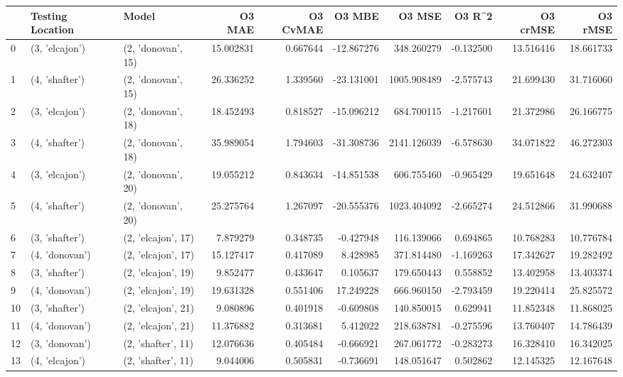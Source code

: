\begin{tabular}{lllrrrrrrr}
\toprule
{} & Testing Location &               Model &     O3 MAE &  O3 CvMAE &     O3 MBE &       O3 MSE &    O3 R\textasciicircum2 &   O3 crMSE &    O3 rMSE \\
\midrule
0  &   (3, 'elcajon') &  (2, 'donovan', 15) &  15.002831 &  0.667644 & -12.867276 &   348.260279 & -0.132500 &  13.516416 &  18.661733 \\
1  &   (4, 'shafter') &  (2, 'donovan', 15) &  26.336252 &  1.339560 & -23.131001 &  1005.908489 & -2.575743 &  21.699430 &  31.716060 \\
2  &   (3, 'elcajon') &  (2, 'donovan', 18) &  18.452493 &  0.818527 & -15.096212 &   684.700115 & -1.217601 &  21.372986 &  26.166775 \\
3  &   (4, 'shafter') &  (2, 'donovan', 18) &  35.989054 &  1.794603 & -31.308736 &  2141.126039 & -6.578630 &  34.071822 &  46.272303 \\
4  &   (3, 'elcajon') &  (2, 'donovan', 20) &  19.055212 &  0.843634 & -14.851538 &   606.755460 & -0.965429 &  19.651648 &  24.632407 \\
5  &   (4, 'shafter') &  (2, 'donovan', 20) &  25.275764 &  1.267097 & -20.555376 &  1023.404092 & -2.665274 &  24.512866 &  31.990688 \\
6  &   (3, 'shafter') &  (2, 'elcajon', 17) &   7.879279 &  0.348735 &  -0.427948 &   116.139066 &  0.694865 &  10.768283 &  10.776784 \\
7  &   (4, 'donovan') &  (2, 'elcajon', 17) &  15.127417 &  0.417089 &   8.428985 &   371.814480 & -1.169263 &  17.342627 &  19.282492 \\
8  &   (3, 'shafter') &  (2, 'elcajon', 19) &   9.852477 &  0.433647 &   0.105637 &   179.650443 &  0.558852 &  13.402958 &  13.403374 \\
9  &   (4, 'donovan') &  (2, 'elcajon', 19) &  19.631328 &  0.551406 &  17.249228 &   666.960150 & -2.793459 &  19.220414 &  25.825572 \\
10 &   (3, 'shafter') &  (2, 'elcajon', 21) &   9.080896 &  0.401918 &  -0.609808 &   140.850015 &  0.629941 &  11.852348 &  11.868025 \\
11 &   (4, 'donovan') &  (2, 'elcajon', 21) &  11.376882 &  0.313681 &   5.412022 &   218.638781 & -0.275596 &  13.760407 &  14.786439 \\
12 &   (3, 'donovan') &  (2, 'shafter', 11) &  12.076636 &  0.405484 &  -0.666921 &   267.061772 & -0.283273 &  16.328410 &  16.342025 \\
13 &   (4, 'elcajon') &  (2, 'shafter', 11) &   9.044006 &  0.505831 &  -0.736691 &   148.051647 &  0.502862 &  12.145325 &  12.167648 \\

\end{tabular}
